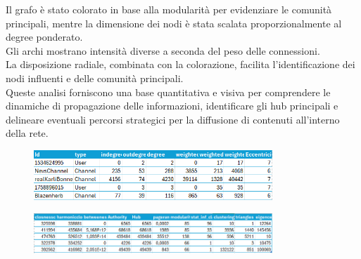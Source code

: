 \documentclass[12pt]{article}
\begin{document}
	Il grafo è stato colorato in base alla modularità per evidenziare le comunità principali, mentre la dimensione dei nodi è stata scalata proporzionalmente al degree ponderato.\\
	Gli archi mostrano intensità diverse a seconda del peso delle connessioni. \\
	La disposizione radiale, combinata con la colorazione, facilita l'identificazione dei nodi influenti e delle comunità principali.
	\\
	Queste analisi forniscono una base quantitativa e visiva per comprendere le dinamiche di propagazione delle informazioni, identificare gli hub principali e delineare eventuali percorsi strategici per la diffusione di contenuti all'interno della rete.
	\begin{figure}[H]
		\centering
		\includegraphics[width=0.8\textwidth]{immagini/tab1}
	\end{figure}
	\begin{figure}[H]
		\centering
		\includegraphics[width=0.8\textwidth]{immagini/tab2}
	\end{figure}
	\newpage
\end{document}
